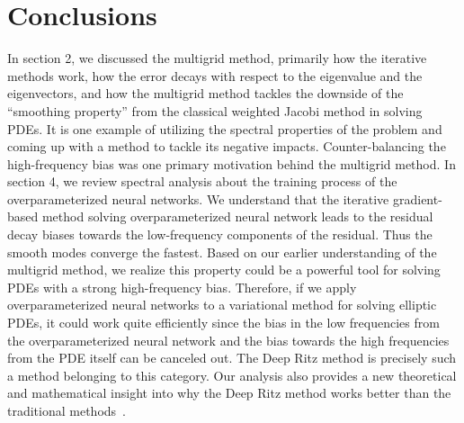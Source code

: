 \documentclass[letterpaper,12pt]{article}
\begin{document}
\section{Conclusions}
In section 2, we discussed the multigrid method, primarily how the iterative methods work, how the error decays with respect to the eigenvalue and the eigenvectors, and how the multigrid method tackles the downside of the ``smoothing property'' from the classical weighted Jacobi method in solving PDEs. It is one example of utilizing the spectral properties of the problem and coming up with a method to tackle its negative impacts. Counter-balancing the high-frequency bias was one primary motivation behind the multigrid method.
In section 4, we review spectral analysis about the training process of the overparameterized neural networks. We understand that the iterative gradient-based method solving overparameterized neural network leads to the residual decay biases towards the low-frequency components of the residual. Thus the smooth modes converge the fastest. Based on our earlier understanding of the multigrid method, we realize this property could be a powerful tool for solving PDEs with a strong high-frequency bias. Therefore, if we apply overparameterized neural networks to a variational method for solving elliptic PDEs, it could work quite efficiently since the bias in the low frequencies from the overparameterized neural network and the bias towards the high frequencies from the PDE itself can be canceled out. The Deep Ritz method is precisely such a method belonging to this category. Our analysis also provides a new theoretical and mathematical insight into why the Deep Ritz method works better than the traditional methods~\cite{e2017deep}. 



\end{document}
